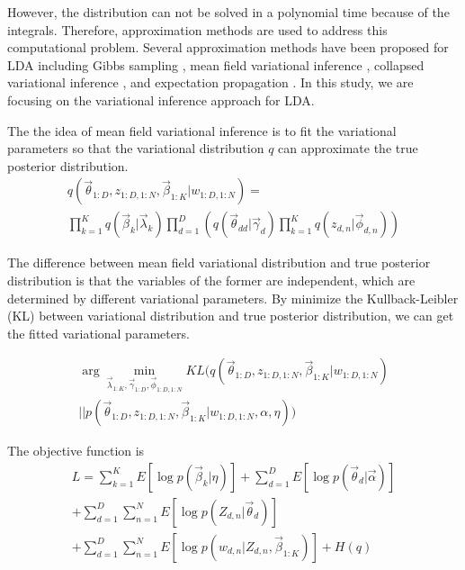 \documentclass[conference]{IEEEtran}
\begin{document}
However, the distribution can not be solved in a polynomial time because of the integrals. Therefore, approximation methods are used to address this computational problem. Several approximation methods have been proposed for LDA including Gibbs sampling \cite{steyvers2007probabilistic}, mean field variational inference \cite{blei2003latent}, collapsed variational inference \cite{teh2006collapsed}, and expectation propagation \cite{minka2002expectation}. In this study, we are focusing on the variational inference approach for LDA.


The the idea of mean field variational inference is to fit the variational parameters so that the variational distribution $q$ can approximate the true posterior distribution.
\begin{equation}
\begin{split}
q(\overrightarrow{\theta}_{1:D},z_{1:D,1:N},\overrightarrow{\beta}_{1:K}|w_{1:D,1:N})=\\
\prod_{k=1}^{K}{q(\overrightarrow{\beta}_k|\overrightarrow{\lambda}_k)}\prod_{d=1}^{D}\left({q(\overrightarrow{\theta}_{dd}|\overrightarrow{\gamma}_d)}\prod_{k=1}^{K}{q(z_{d,n}|\overrightarrow{\phi}_{d,n})}\right)
\end{split}
\end{equation}

The difference between mean field variational distribution and true posterior distribution is that the variables of the former are independent, which are determined by different variational parameters. By minimize the Kullback-Leibler (KL) between variational distribution and true posterior distribution, we can get the fitted variational parameters.

\begin{equation}
\begin{split}
\arg \min_{\overrightarrow{\lambda}_{1:K},\overrightarrow{\gamma}_{1:D},\overrightarrow{\phi}_{1:D,1:N}} KL(q(\overrightarrow{\theta}_{1:D},z_{1:D,1:N},\overrightarrow{\beta}_{1:K}|w_{1:D,1:N})\\
||p(\overrightarrow{\theta}_{1:D},z_{1:D,1:N},\overrightarrow{\beta}_{1:K}|w_{1:D,1:N},\alpha,\eta))
\end{split}
\end{equation}

The objective function is
\begin{equation}
\begin{split}
L = \sum_{k=1}^{K}E[\log p(\overrightarrow{\beta}_{k}|\eta)]+
\sum_{d=1}^{D}{E[\log p(\overrightarrow{\theta}_d|\overrightarrow{\alpha})]} \\
+ \sum_{d=1}^{D}\sum_{n=1}^{N}{E[\log p(Z_{d,n}|\overrightarrow{\theta}_d)]} \\
+ \sum_{d=1}^{D}\sum_{n=1}^{N}{E[\log p(w_{d,n}|Z_{d,n},\overrightarrow{\beta}_{1:K})]}+H(q)
\end{split}
\end{equation}
\end{document}
